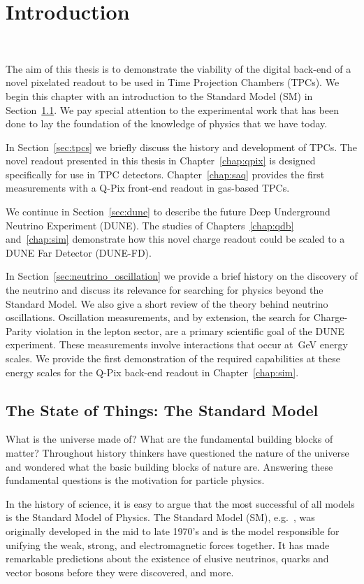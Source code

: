\chapter{Introduction}~\label{chap:intro}

The aim of this thesis is to demonstrate the viability of the digital back-end of a novel pixelated readout to be used in Time Projection Chambers (TPCs). 
We begin this chapter with an introduction to the Standard Model (SM) in Section~\ref{sec:standard_model}.
We pay special attention to the experimental work that has been done to lay the foundation of the knowledge of physics that we have today.

In Section~\ref{sec:tpcs} we briefly discuss the history and development of TPCs. 
The novel readout presented in this thesis in Chapter~\ref{chap:qpix} is designed specifically for use in TPC detectors.
Chapter~\ref{chap:saq} provides the first measurements with a Q-Pix front-end readout in gas-based TPCs.

We continue in Section~\ref{sec:dune} to describe the future Deep Underground Neutrino Experiment (DUNE).
The studies of Chapters~\ref{chap:qdb} and~\ref{chap:sim} demonstrate how this novel charge readout could be scaled to a DUNE Far Detector (DUNE-FD).

In Section~\ref{sec:neutrino_oscillation} we provide a brief history on the discovery of the neutrino and discuss its relevance for searching for physics beyond the Standard Model.
We also give a short review of the theory behind neutrino oscillations.
Oscillation measurements, and by extension, the search for Charge-Parity violation in the lepton sector, are a primary scientific goal of the DUNE experiment.
These measurements involve interactions that occur at~\unit{GeV} energy scales.
We provide the first demonstration of the required capabilities at these energy scales for the Q-Pix back-end readout in Chapter~\ref{chap:sim}.

\section{The State of Things: The Standard Model}
\label{sec:standard_model}
What is the universe made of?
What are the fundamental building blocks of matter?
Throughout history thinkers have questioned the nature of the universe and wondered what the basic building blocks of nature are.
Answering these fundamental questions is the motivation for particle physics.

In the history of science, it is easy to argue that the most successful of all models is the Standard Model of Physics.
The Standard Model (SM), e.g.~\citep{GLASHOW1961579, salam1964electromagnetic, weinberg1967model}, was originally developed in the mid to late 1970's and is the model responsible for unifying the weak, strong, and electromagnetic forces together.
It has made remarkable predictions about the existence of elusive neutrinos, quarks and vector bosons before they were discovered, and more.

